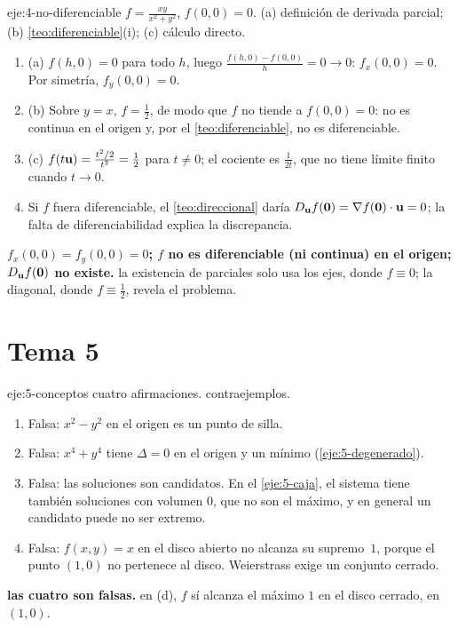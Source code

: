 \begin{solucion}{eje:4-no-diferenciable}
\datos $f=\frac{xy}{x^2+y^2}$, $f(0,0)=0$.
\planteamiento (a) definición de derivada parcial; (b) \cref{teo:diferenciable}(i); (c) cálculo directo.
\pasos
\begin{enumerate}[label=\arabic*.]
  \item (a) $f(h,0)=0$ para todo $h$, luego $\frac{f(h,0)-f(0,0)}{h}=0\to0$: $f_x(0,0)=0$. Por simetría, $f_y(0,0)=0$.
  \item (b) Sobre $y=x$, $f=\frac12$, de modo que $f$ no tiende a $f(0,0)=0$: no es continua en el origen y, por el \cref{teo:diferenciable}, no es diferenciable.
  \item (c) $f(t\mathbf{u})=\frac{t^2/2}{t^2}=\frac12$ para $t\neq0$; el cociente es $\frac{1}{2t}$, que no tiene límite finito cuando $t\to0$.
  \item Si $f$ fuera diferenciable, el \cref{teo:direccional} daría $D_{\mathbf{u}}f(\mathbf{0})=\nabla f(\mathbf{0})\cdot\mathbf{u}=0$; la falta de diferenciabilidad explica la discrepancia.
\end{enumerate}
\resultado \textbf{$f_x(0,0)=f_y(0,0)=0$; $f$ no es diferenciable (ni continua) en el origen; $D_{\mathbf{u}}f(\mathbf{0})$ no existe.}
\comprobacion la existencia de parciales solo usa los ejes, donde $f\equiv0$; la diagonal, donde $f\equiv\frac12$, revela el problema.
\end{solucion}

\section{Tema 5}

\begin{solucion}{eje:5-conceptos}
\datos cuatro afirmaciones.
\planteamiento contraejemplos.
\pasos
\begin{enumerate}[label=(\alph*)]
  \item Falsa: $x^2-y^2$ en el origen es un punto de silla.
  \item Falsa: $x^4+y^4$ tiene $\Delta=0$ en el origen y un mínimo (\cref{eje:5-degenerado}).
  \item Falsa: las soluciones son candidatos. En el \cref{eje:5-caja}, el sistema tiene también soluciones con volumen $0$, que no son el máximo, y en general un candidato puede no ser extremo.
  \item Falsa: $f(x,y)=x$ en el disco abierto no alcanza su supremo~$1$, porque el punto $(1,0)$ no pertenece al disco. Weierstrass exige un conjunto cerrado.
\end{enumerate}
\resultado \textbf{las cuatro son falsas.}
\comprobacion en (d), $f$ sí alcanza el máximo $1$ en el disco cerrado, en $(1,0)$.
\end{solucion}


